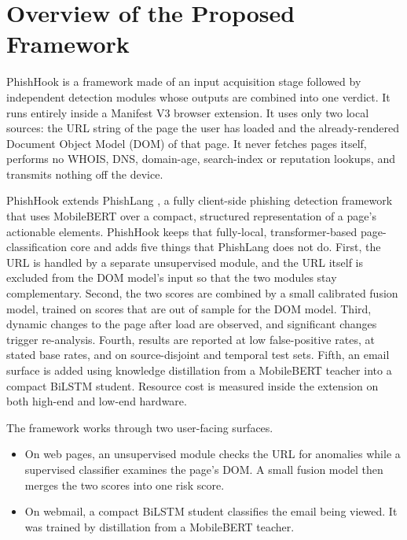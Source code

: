 \documentclass{FastFyp}
\begin{document}
\section{Overview of the Proposed Framework}
\label{sec:framework}

PhishHook is a framework made of an input acquisition stage followed by independent detection modules whose outputs are combined into one verdict. It runs entirely inside a Manifest V3 browser extension. It uses only two local sources: the URL string of the page the user has loaded and the already-rendered Document Object Model (DOM) of that page. It never fetches pages itself, performs no WHOIS, DNS, domain-age, search-index or reputation lookups, and transmits nothing off the device.

PhishHook extends PhishLang \cite{phishlang2026}, a fully client-side phishing detection framework that uses MobileBERT over a compact, structured representation of a page's actionable elements. PhishHook keeps that fully-local, transformer-based page-classification core and adds five things that PhishLang does not do. First, the URL is handled by a separate unsupervised module, and the URL itself is excluded from the DOM model's input so that the two modules stay complementary. Second, the two scores are combined by a small calibrated fusion model, trained on scores that are out of sample for the DOM model. Third, dynamic changes to the page after load are observed, and significant changes trigger re-analysis. Fourth, results are reported at low false-positive rates, at stated base rates, and on source-disjoint and temporal test sets. Fifth, an email surface is added using knowledge distillation from a MobileBERT teacher into a compact BiLSTM student. Resource cost is measured inside the extension on both high-end and low-end hardware.

The framework works through two user-facing surfaces.
\begin{itemize}
    \item On web pages, an unsupervised module checks the URL for anomalies while a supervised classifier examines the page's DOM. A small fusion model then merges the two scores into one risk score.
    \item On webmail, a compact BiLSTM student classifies the email being viewed. It was trained by distillation from a MobileBERT teacher.
\end{itemize}
\end{document}
